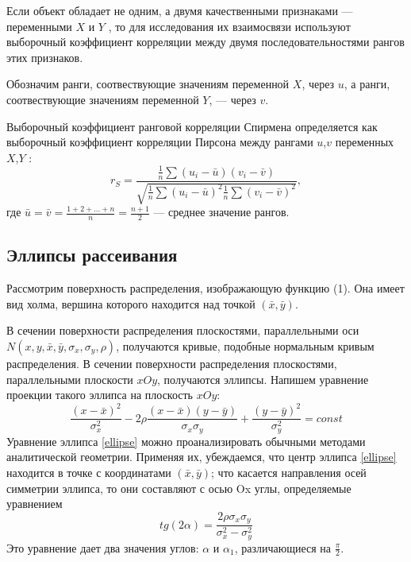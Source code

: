 \documentclass[12pt]{article}
\begin{document}
	Если объект обладает не одним, а двумя качественными признаками — переменными $X$ и $Y$ , то для исследования их взаимосвязи используют выборочный коэффициент корреляции между двумя последовательностями рангов этих признаков.

	Обозначим ранги, соотвествующие значениям переменной $X$, через $u$, а ранги, соотвествующие значениям переменной $Y$, — через $v$.

	Выборочный коэффициент ранговой корреляции Спирмена определяется как выборочный коэффициент корреляции Пирсона между рангами $u$,$v$ переменных $X$,$Y$ :
	\begin{equation}
		r_{S} = \frac{
			\frac{1}{n}\sum{(u_{i} - \bar{u})(v_{i}-\bar{v})}
		}{
			\sqrt{\frac{1}{n}\sum{(u_{i} - \bar{u})^{2}}\frac{1}{n}\sum{(v_{i} - \bar{v})^{2}}}
		},
		\label{rS}
	\end{equation}
	где $\bar{u} = \bar{v} = \frac{1 + 2 + ... + n}{n} = \frac{n + 1}{2}$ — среднее значение рангов.
	\subsection{Эллипсы рассеивания}
	Рассмотрим поверхность распределения, изображающую функцию (1). Она имеет вид холма, вершина которого находится над точкой $(\bar{x},\bar{y})$.

	В сечении поверхности распределения плоскостями, параллельными оси $ N(x, y, \bar{x}, \bar{y}, \sigma_{x}, \sigma_{y}, \rho)$, получаются кривые, подобные нормальным кривым распределения. В сечении поверхности распределения плоскостями, параллельными плоскости $xOy$, получаются эллипсы. Напишем уравнение проекции такого эллипса на плоскость $xOy$: 
	\begin{equation}
		\frac{(x-\bar{x})^{2}}{\sigma_{x}^{2}} - 
		2\rho\frac{(x-\bar{x})(y-\bar{y})}{\sigma_{x}\sigma_{y}}+
		\frac{(y-\bar{y})^{2}}{\sigma_{y}^{2}} = const
		\label{ellipse}
	\end{equation}
	Уравнение эллипса \ref{ellipse} можно проанализировать обычными методами аналитической геометрии. Применяя их, убеждаемся, что центр эллипса \ref{ellipse} находится в точке с координатами $(\bar{x},\bar{y})$; что касается направления осей симметрии эллипса, то они составляют с осью Ox углы, определяемые уравнением
	\begin{equation}
		tg(2\alpha) = \frac{2\rho\sigma_{x}\sigma_{y}}{\sigma_{x}^{2} - \sigma_{y}^{2}}
		\label{angle}
	\end{equation}
	Это уравнение дает два значения углов: $\alpha$ и $\alpha_{1}$, различающиеся на $\frac{\pi}{2}$.
\end{document}
